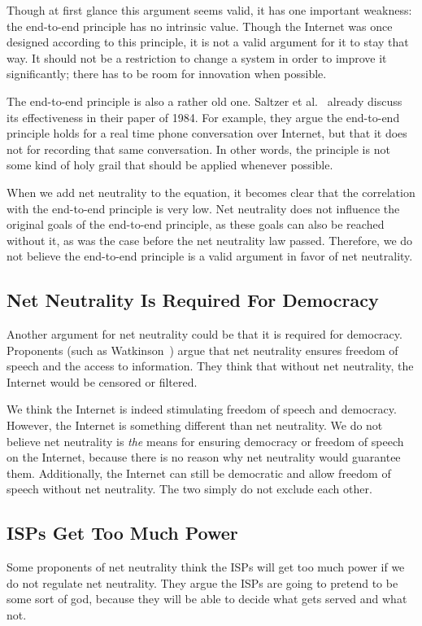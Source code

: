 Though at first glance this argument seems valid, it has one important weakness: the end-to-end principle has no intrinsic value. Though the Internet was once designed according to this principle, it is not a valid argument for it to stay that way.
It should not be a restriction to change a system in order to improve it significantly; there has to be room for innovation when possible.

The end-to-end principle is also a rather old one.
Saltzer et al.~\cite{saltzer1984end} already discuss its effectiveness in their paper of 1984.
For example, they argue the end-to-end principle holds for a real time phone conversation over Internet, but that it does not for recording that same conversation.
In other words, the principle is not some kind of holy grail that should be applied whenever possible.

When we add net neutrality to the equation, it becomes clear that the correlation with the end-to-end principle is very low.
Net neutrality does not influence the original goals of the end-to-end principle, as these goals can also be reached without it, as was the case before the net neutrality law passed.
Therefore, we do not believe the end-to-end principle is a valid argument in favor of net neutrality.

\subsection{Net Neutrality Is Required For Democracy}
Another argument for net neutrality could be that it is required for democracy.
Proponents (such as Watkinson~\cite{watkinson2012democracy}) argue that net neutrality ensures freedom of speech and the access to information.
They think that without net neutrality, the Internet would be censored or filtered.

We think the Internet is indeed stimulating freedom of speech and democracy.
However, the Internet is something different than net neutrality.
We do not believe net neutrality is \emph{the} means for ensuring democracy or freedom of speech on the Internet, because there is no reason why net neutrality would guarantee them.
Additionally, the Internet can still be democratic and allow freedom of speech without net neutrality.
The two simply do not exclude each other.

\subsection{\acp{ISP} Get Too Much Power}
Some proponents of net neutrality think the \acp{ISP} will get too much power if we do not regulate net neutrality.
They argue the \acp{ISP} are going to pretend to be some sort of god, because they will be able to decide what gets served and what not. %

